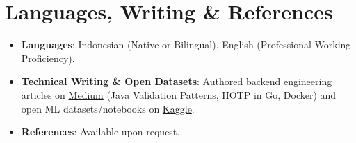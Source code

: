 \documentclass[11pt,a4paper,sans]{moderncv}
\begin{document}

\section{Languages, Writing \& References}
\vspace{1pt}
\begin{itemize}
\item \textbf{Languages}: Indonesian (Native or Bilingual), English (Professional Working Proficiency).
\item \textbf{Technical Writing \& Open Datasets}: Authored backend engineering articles on \href{https://medium.com/@5mblackburn7}{Medium} (Java Validation Patterns, HOTP in Go, Docker) and open ML datasets/notebooks on \href{https://www.kaggle.com/ridhomuhammad}{Kaggle}.
\item \textbf{References}: Available upon request.
\end{itemize}
\end{document}
